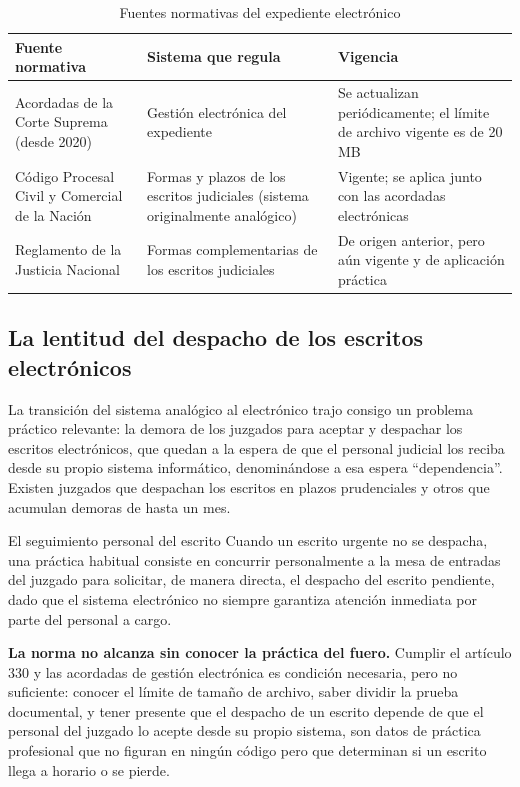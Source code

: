 \documentclass[12pt,oneside]{book}
\begin{document}
\begin{table}[H]
\centering
\caption{Fuentes normativas del expediente electrónico}
\begin{tabularx}{\textwidth}{>{\raggedright\arraybackslash}p{} >{\raggedright\arraybackslash}p{} X}
\toprule
\textbf{Fuente normativa} & \textbf{Sistema que regula} & \textbf{Vigencia} \\
\midrule
Acordadas de la Corte Suprema (desde 2020) & Gestión electrónica del expediente & Se actualizan periódicamente; el límite de archivo vigente es de 20 MB \\
Código Procesal Civil y Comercial de la Nación & Formas y plazos de los escritos judiciales (sistema originalmente analógico) & Vigente; se aplica junto con las acordadas electrónicas \\
Reglamento de la Justicia Nacional & Formas complementarias de los escritos judiciales & De origen anterior, pero aún vigente y de aplicación práctica \\
\bottomrule
\end{tabularx}
\end{table}

\subsection{La lentitud del despacho de los escritos electrónicos}

La transición del sistema analógico al electrónico trajo consigo un problema práctico relevante: la demora de los juzgados para aceptar y despachar los escritos electrónicos, que quedan a la espera de que el personal judicial los reciba desde su propio sistema informático, denominándose a esa espera ``dependencia''. Existen juzgados que despachan los escritos en plazos prudenciales y otros que acumulan demoras de hasta un mes.

\begin{example}{El seguimiento personal del escrito}
Cuando un escrito urgente no se despacha, una práctica habitual consiste en concurrir personalmente a la mesa de entradas del juzgado para solicitar, de manera directa, el despacho del escrito pendiente, dado que el sistema electrónico no siempre garantiza atención inmediata por parte del personal a cargo.
\end{example}

\begin{important}
\textbf{La norma no alcanza sin conocer la práctica del fuero.} Cumplir el artículo 330 y las acordadas de gestión electrónica es condición necesaria, pero no suficiente: conocer el límite de tamaño de archivo, saber dividir la prueba documental, y tener presente que el despacho de un escrito depende de que el personal del juzgado lo acepte desde su propio sistema, son datos de práctica profesional que no figuran en ningún código pero que determinan si un escrito llega a horario o se pierde.
\end{important}
\end{document}
